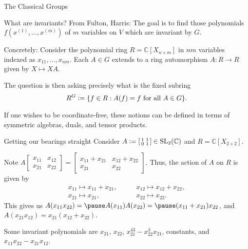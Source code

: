\documentclass{beamer}
\newcommand{\deff}[1]{{\color{blue}#1}}
\newcommand{\smatrix}[1]{\left[\begin{smallmatrix} #1 \end{smallmatrix}\right]}
\DeclareMathOperator{\SL}{SL}
\DeclareMathOperator{\Sp}{Sp}
\newenvironment{blurb}
{\par\tiny}
{\par\addvspace{\bigskipamount}}
\begin{document}
\begin{frame}{The Classical Groups}
	  	
	\end{frame}

	\begin{frame}{What are invariants?}
		From Fulton, Harris: The goal is to find those polynomials $f(x^{(1)}, \ldots, x^{(m)})$ of $m$ variables on $V$ which are invariant by $G$. \newline

		\pause Concretely: Consider the polynomial ring $R = \mathbb{C}[X_{n \times m}]$ in $nm$ variables indexed as $x_{11}, \ldots, x_{nm}$. \pause Each $A \in G$ extends to a ring automorphism $A : R \to R$ given by $X \mapsto XA$. \newline

		\pause The question is then asking precisely what is the \deff{fixed subring}
		\begin{equation*} 
			R^{G} \vcentcolon= \{f \in R : A(f) = f \text{ for all } A \in G\}.
		\end{equation*}

		\pause
		\begin{blurb} 
			If one wishes to be coordinate-free, these notions can be defined in terms of symmetric algebras, duals, and tensor products.
		\end{blurb}
	\end{frame}

	\begin{frame}{Getting our bearings straight}
		Consider $A \vcentcolon= \smatrix{1 & 1 \\ 0 & 1} \in \SL_{2}(\mathbb{C})$ and $R = \mathbb{C}[X_{2 \times 2}]$. 

		\pause Note $A \smatrix{x_{11} & x_{12} \\ x_{21} & x_{22}} = \smatrix{x_{11} + x_{21} & x_{12} + x_{22} \\ x_{21} & x_{22}}$. \pause Thus, the action of $A$ on $R$ is given by
		\begin{align*} 
			x_{11} \mapsto x_{11} + x_{21},\qquad& x_{12} \mapsto x_{12} + x_{22}, \\
			x_{21} \mapsto x_{21},\qquad& x_{22} \mapsto x_{22}.
		\end{align*}
		\pause This gives us $A(x_{11} x_{22}) = \pause A(x_{11}) A(x_{22}) = \pause (x_{11} + x_{21})x_{22}$, \pause and $A(x_{21} x_{12}) = x_{21}(x_{12} + x_{22})$. \newline

		\pause Some invariant polynomials are \pause $x_{21}$, \pause $x_{22}$, \pause $x_{21}^{43} - x_{22}^{3} x_{21}$, \pause constants, \pause and $x_{11} x_{22} - x_{21} x_{12}$.
	\end{frame}
\end{document}
